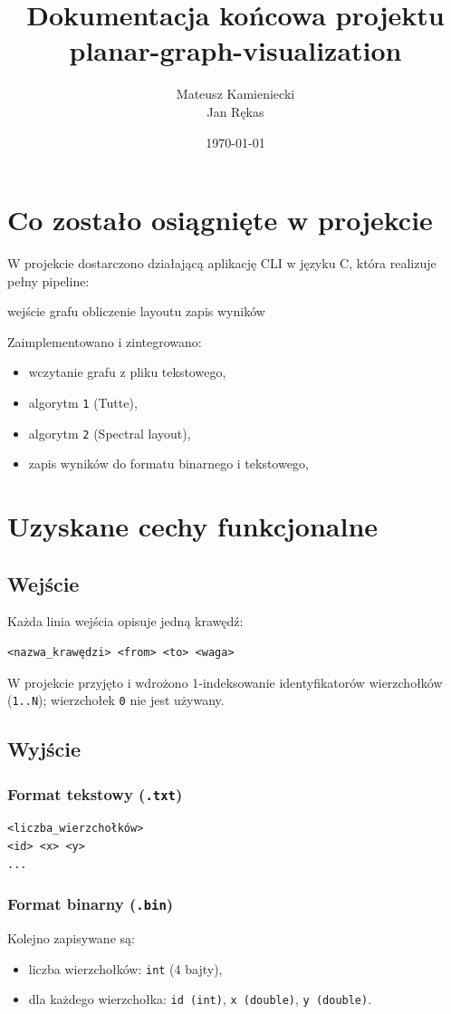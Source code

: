\documentclass[12pt]{article}
\title{Dokumentacja końcowa projektu\\planar-graph-visualization}
\author{Mateusz Kamieniecki \\ Jan Rękas}
\date{\today}
\begin{document}
\maketitle
\tableofcontents

\section{Co zostało osiągnięte w projekcie}
W projekcie dostarczono działającą aplikację CLI w języku C, która realizuje pełny
pipeline:
\begin{center}
	wejście grafu \textrightarrow{} obliczenie layoutu \textrightarrow{} zapis wyników
\end{center}
Zaimplementowano i zintegrowano:
\begin{itemize}
	\item wczytanie grafu z pliku tekstowego,
	\item algorytm \texttt{1} (Tutte),
	\item algorytm \texttt{2} (Spectral layout),
	\item zapis wyników do formatu binarnego i tekstowego,
\end{itemize}

\section{Uzyskane cechy funkcjonalne}
\subsection{Wejście}
Każda linia wejścia opisuje jedną krawędź:
\begin{verbatim}
<nazwa_krawędzi> <from> <to> <waga>
\end{verbatim}
W projekcie przyjęto i wdrożono 1-indeksowanie identyfikatorów wierzchołków
(\texttt{1..N}); wierzchołek \texttt{0} nie jest używany.

\subsection{Wyjście}
\subsubsection{Format tekstowy (\texttt{.txt})}
\begin{verbatim}
<liczba_wierzchołków>
<id> <x> <y>
...
\end{verbatim}

\subsubsection{Format binarny (\texttt{.bin})}
Kolejno zapisywane są:
\begin{itemize}
	\item liczba wierzchołków: \texttt{int} (4 bajty),
	\item dla każdego wierzchołka: \texttt{id (int)}, \texttt{x (double)}, \texttt{y (double)}.
\end{itemize}
\end{document}
